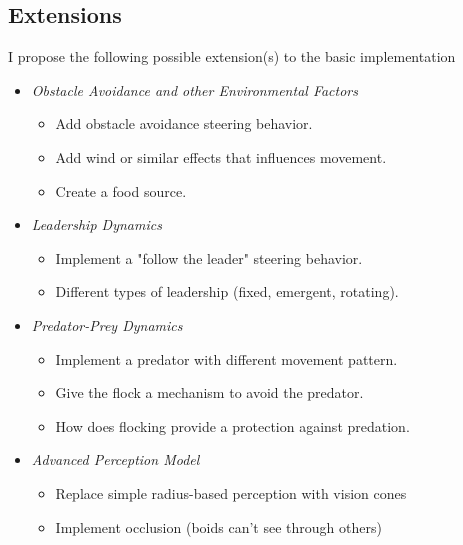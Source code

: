 \subsection{Extensions}
I propose the following possible extension(s) to the basic implementation
\begin{itemize}
	\item \textit{Obstacle Avoidance and other Environmental Factors}
		\begin{itemize}
			\item Add obstacle avoidance steering behavior.
			\item Add wind or similar effects that influences movement.
			\item Create a food source.
		\end{itemize}
	\item \textit{Leadership Dynamics}
		\begin{itemize}
			\item Implement a "follow the leader" steering behavior.
			\item Different types of leadership (fixed, emergent, rotating).
		\end{itemize}
	\item \textit{Predator-Prey Dynamics}
		\begin{itemize}
			\item Implement a predator with different movement pattern.
			\item Give the flock a mechanism to avoid the predator.
			\item How does flocking provide a protection against predation.
		\end{itemize}
	\item \textit{Advanced Perception Model}
		\begin{itemize}
			\item Replace simple radius-based perception with vision cones
			\item Implement occlusion (boids can't see through others)
		\end{itemize}
\end{itemize}



